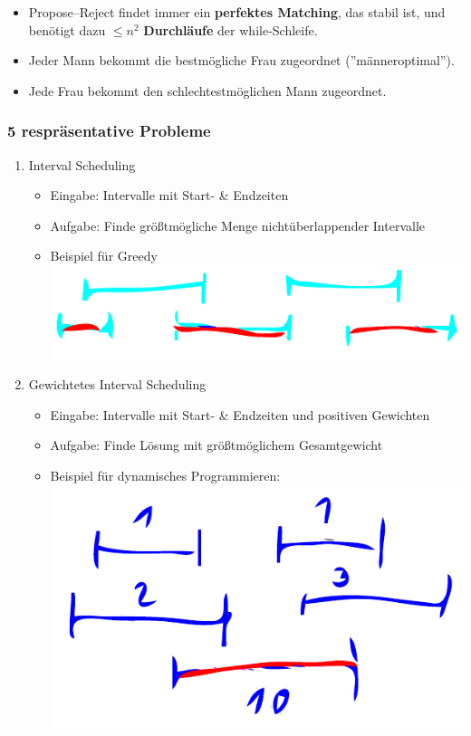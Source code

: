 \documentclass{scrartcl}
\begin{document}
\begin{itemize}
	\item Propose--Reject findet immer ein \textbf{perfektes Matching}, das stabil ist, und benötigt dazu $ \leq n^2 $ \textbf{Durchläufe} der while-Schleife.
	\item Jeder Mann bekommt die bestmögliche Frau zugeordnet (''männeroptimal'').
	\item Jede Frau bekommt den schlechtestmöglichen Mann zugeordnet.
\end{itemize}

\subsubsection{5 respräsentative Probleme}
\begin{enumerate}
	\item Interval Scheduling
	\begin{itemize}
		\item Eingabe: Intervalle mit Start- \& Endzeiten
		\item Aufgabe: Finde größtmögliche Menge nichtüberlappender Intervalle
		\item Beispiel für Greedy \\
		\includegraphics[width=\linewidth]{figures/interval-scheduling.pdf}
	\end{itemize}
	\item Gewichtetes Interval Scheduling
	\begin{itemize}
		\item Eingabe: Intervalle mit Start- \& Endzeiten und positiven Gewichten
		\item Aufgabe: Finde Lösung mit größtmöglichem Gesamtgewicht
		\item Beispiel für dynamisches Programmieren: \\
		\includegraphics[width=\linewidth]{figures/gewichtetes-interval-scheduling.pdf}

\end{itemize}
\end{enumerate}
\end{document}
